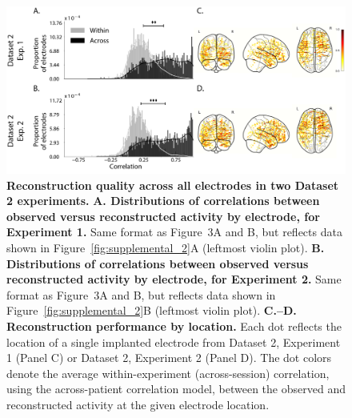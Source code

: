 \documentclass[10pt]{article}
\begin{document}
\begin{figure}[p]
\centering
\includegraphics[width=\textwidth]{figs/supplemental_3}
\caption{\textbf{Reconstruction quality across all electrodes in two
      Dataset 2 experiments.}  \textbf{A. Distributions of correlations
      between observed versus reconstructed activity by electrode, for
      Experiment 1.}  Same format as Figure~3A and B, but reflects data shown
    in Figure~\ref{fig:supplemental_2}A (leftmost violin plot).
 \textbf{B. Distributions of correlations
      between observed versus reconstructed activity by electrode, for
      Experiment 2.}  Same format as Figure~3A and B, but reflects
    data shown in Figure~\ref{fig:supplemental_2}B (leftmost violin
    plot).  \textbf{C.--D.  Reconstruction
      performance by location.} Each dot reflects the location of a
    single implanted electrode from Dataset 2, Experiment 1 (Panel C)
    or Dataset 2, Experiment 2 (Panel D).  The dot colors denote the
    average within-experiment (across-session)
    correlation, using the across-patient correlation model, between
    the observed and reconstructed activity at the given electrode
    location.}
\label{fig:supplemental_3}
\end{figure}
\end{document}
